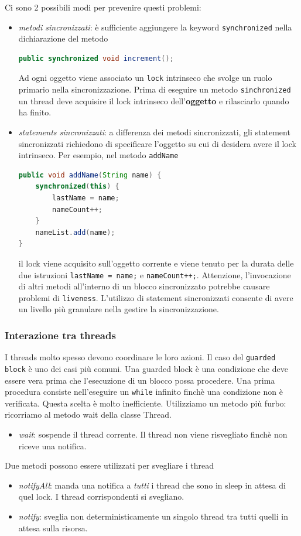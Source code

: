 \documentclass{article}
\begin{document}
Ci sono 2 possibili modi per prevenire questi problemi:
\begin{itemize}
\item \emph{metodi sincronizzati}: \`e sufficiente aggiungere la keyword \texttt{synchronized} nella dichiarazione del metodo
\begin{lstlisting}[language=Java]
public synchronized void increment();
\end{lstlisting}
Ad ogni oggetto viene associato un \texttt{lock} intrinseco che svolge un ruolo primario nella sincronizzazione. Prima di eseguire un metodo \texttt{sinchronized} un thread deve acquisire il lock intrinseco dell'\textbf{oggetto} e rilasciarlo quando ha finito.
\item \emph{statements sincronizzati}: a differenza dei metodi sincronizzati, gli statement sincronizzati richiedono di specificare l'oggetto su cui di desidera avere il lock intrinseco. Per esempio, nel metodo \texttt{addName}
\begin{lstlisting}[language=Java]
public void addName(String name) {
    synchronized(this) {
        lastName = name;
        nameCount++;
    }
    nameList.add(name);
}
\end{lstlisting}
il lock viene acquisito sull'oggetto corrente e viene tenuto per la durata delle due istruzioni \texttt{lastName = name;} e \texttt{nameCount++;}. Attenzione, l'invocazione di altri metodi all'interno di un blocco sincronizzato potrebbe causare problemi di \texttt{liveness}. L'utilizzo di statement sincronizzati consente di avere un livello pi\`u granulare nella gestire la sincronizzazione.
\end{itemize}


\subsubsection{Interazione tra threads}
I threads molto spesso devono coordinare le loro azioni. Il caso del \texttt{guarded block} \`e uno dei casi pi\`u comuni. Una guarded block \`e una condizione che deve essere vera prima che l'esecuzione di un blocco possa procedere. Una prima procedura consiste nell'eseguire un \texttt{while} infinito finch\`e una condizione non \`e verificata. Questa scelta \`e molto inefficiente. Utilizziamo un metodo pi\`u furbo: ricorriamo al metodo wait della classe Thread.
\begin{itemize}
\item \emph{wait}: sospende il thread corrente. Il thread non viene risvegliato finch\`e non riceve una notifica.
\end{itemize}
Due metodi possono essere utilizzati per svegliare i thread
\begin{itemize}
\item \emph{notifyAll}: manda una notifica a \emph{tutti} i thread che sono in sleep in attesa di quel lock. I thread corrispondenti si svegliano.
\item \emph{notify}: sveglia non deterministicamente un singolo thread tra tutti quelli in attesa sulla risorsa.
\end{itemize}
\end{document}
